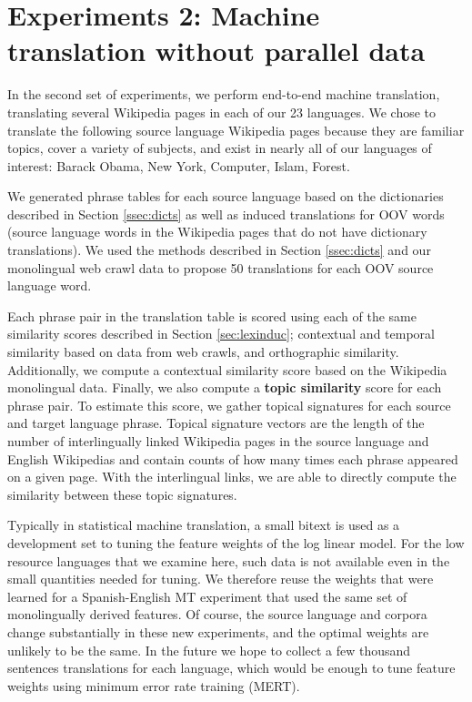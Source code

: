 \documentclass[11pt]{article}
\begin{document}





\section{Experiments 2: Machine translation without parallel data}\label{sec:mtwpd}
In the second set of experiments, we perform end-to-end machine translation, translating several Wikipedia pages in each of our 23 languages. We chose to translate the following source language Wikipedia pages because they are familiar topics, cover a variety of subjects, and exist in nearly all of our languages of interest: Barack Obama, New York, Computer, Islam, Forest. 

We generated phrase tables for each source language based on the dictionaries described in Section \ref{ssec:dicts} as well as induced translations for OOV words (source language words in the Wikipedia pages that do not have dictionary translations). We used the methods described in Section \ref{ssec:dicts} and our monolingual web crawl data to propose 50 translations for each OOV source language word.

Each phrase pair in the translation table is scored using each of the same similarity scores described in Section \ref{sec:lexinduc}; contextual and temporal similarity based on data from web crawls, and orthographic similarity. Additionally, we compute a contextual similarity score based on the Wikipedia monolingual data. Finally, we also compute a {\bf topic similarity} score for each phrase pair. To estimate this score, we gather topical signatures for each source and target language phrase. Topical signature vectors are the length of the number of interlingually linked Wikipedia pages in the source language and English Wikipedias and contain counts of how many times each phrase appeared on a given page. With the interlingual links, we are able to directly compute the similarity between these topic signatures. 

Typically in statistical machine translation, a small bitext is used as a development set to tuning the feature weights of the log linear model.  For the low resource languages that we examine here, such data is not available even in the small quantities needed for tuning.  We therefore reuse the weights that were learned for a Spanish-English MT experiment that used the same set of monolingually derived features. Of course, the source language and corpora change substantially in these new experiments, and the optimal weights are unlikely to be the same. In the future we hope to collect a few thousand sentences translations for each language, which would be enough to tune feature weights using minimum error rate training (MERT).
\end{document}

